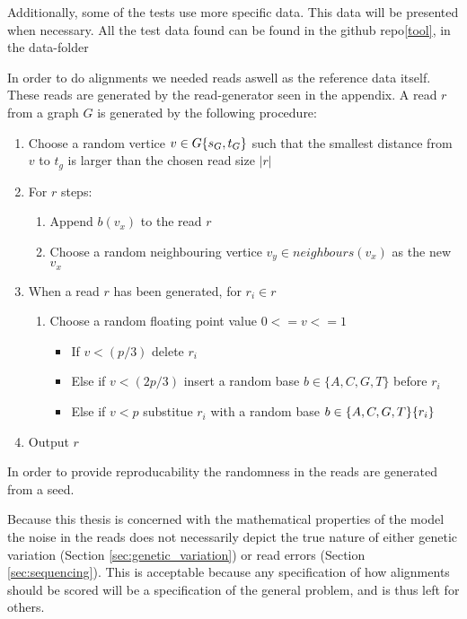 \documentclass[thesis.tex]{subfiles}
\begin{document}
Additionally, some of the tests use more specific data. This data will be presented when necessary. All the test data found can be found in the github repo\ref{tool}, in the data-folder\\
\par\noindent
In order to do alignments we needed reads aswell as the reference data itself. These reads are generated by the read-generator seen in the appendix. A read $r$ from a graph $G$ is generated by the following procedure:
\begin{enumerate}
  \item Choose a random vertice $v \in G\\\{s_G, t_G\}$ such that the smallest distance from $v$ to $t_g$ is larger than the chosen read size $|r|$
  \item For $r$ steps:
  \begin{enumerate}
    \item Append $b(v_x)$ to the read $r$
    \item Choose a random neighbouring vertice $v_y \in neighbours(v_x)$ as the new $v_x$
  \end{enumerate}
  \item When a read $r$ has been generated, for $r_i \in r$
  \begin{enumerate}
    \item Choose a random floating point value $0<=v<=1$
    \begin{itemize}
      \item If $v<(p/3)$ delete $r_i$
      \item Else if $v<(2p/3)$ insert a random base $b \in \{A, C, G, T\}$ before $r_i$
      \item Else if $v<p$ substitue $r_i$ with a random base $b \in \{A, C, G, T\} \\ \{r_i\}$
    \end{itemize}
  \end{enumerate}
  \item Output $r$
\end{enumerate}
In order to provide reproducability the randomness in the reads are generated from a seed.\\
\par\noindent
Because this thesis is concerned with the mathematical properties of the model the noise in the reads does not necessarily depict the true nature of either genetic variation (Section \ref{sec:genetic_variation}) or read errors (Section \ref{sec:sequencing}). This is acceptable because any specification of how alignments should be scored will be a specification of the general problem, and is thus left for others.
\end{document}
